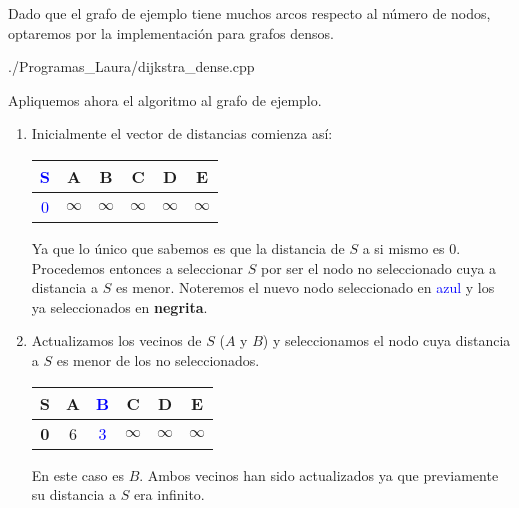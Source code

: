 \documentclass[12pt]{article}
\begin{document}
\begin{ejercicio}
        Dado que el grafo de ejemplo tiene muchos arcos respecto al 
        número de nodos, optaremos por la implementación para grafos 
        densos.
        
        {./Programas_Laura/dijkstra_dense.cpp}

        Apliquemos ahora el algoritmo al grafo de ejemplo.
        \begin{enumerate}
            \item 
            Inicialmente el vector de distancias comienza así:
            \begin{center}
                \begin{tabular}{|c|c|c|c|c|c|}
                    \hline
                    \textcolor{blue}{S}&A&B&C&D&E \\
                    \hline
                    \textcolor{blue}{0}&$\infty$&$\infty$&$\infty$&$\infty$&$\infty$ \\
                    \hline
                \end{tabular}
            \end{center}
            Ya que lo único que sabemos es que la distancia de $S$ a 
            si mismo es 0. Procedemos entonces a seleccionar $S$ 
            por ser el nodo no seleccionado cuya a distancia a $S$ 
            es menor. Noteremos el nuevo nodo seleccionado en 
            \textcolor{blue}{azul} y los ya seleccionados en 
            \textbf{negrita}.

            \item 
            Actualizamos los vecinos de $S$ ($A$ y $B$) y seleccionamos el nodo 
            cuya distancia a $S$ es menor de los no seleccionados.
            \begin{center}
                \begin{tabular}{|c|c|c|c|c|c|}
                    \hline
                    \textbf{S}&A&\textcolor{blue}{B}&C&D&E \\
                    \hline
                    \textbf{0}&{6}&\textcolor{blue}{3}&
                    $\infty$&$\infty$&$\infty$ \\
                    \hline
                \end{tabular}
            \end{center}
            En este caso es $B$. Ambos vecinos han sido actualizados 
            ya que previamente su distancia a $S$ era infinito.


\end{enumerate}
\end{ejercicio}
\end{document}
